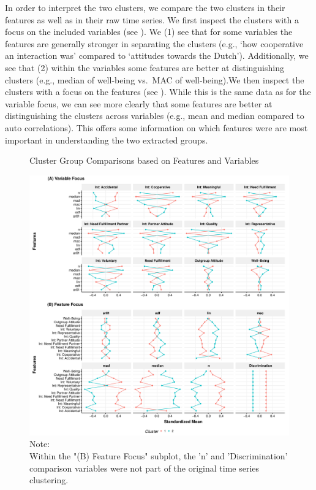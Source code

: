 In order to interpret the two clusters, we compare the two clusters in
their features as well as in their raw time series. We first inspect the
clusters with a focus on the included variables (see
). We (1) see that for some variables the
features are generally stronger in separating the clusters (e.g., `how
cooperative an interaction was' compared to `attitudes towards the
Dutch'). Additionally, we see that (2) within the variables some
features are better at distinguishing clusters (e.g., median of
well-being vs.~MAC of well-being).We then inspect the clusters with a
focus on the features (see ). While this
is the same data as for the variable focus, we can see more clearly that
some features are better at distinguishing the clusters across variables
(e.g., mean and median compared to auto correlations). This offers some
information on which features were are most important in understanding
the two extracted groups.

\begin{figure}[!ht] %
  \caption{Cluster Group Comparisons based on Features and Variables}
  \label{fig:clusterFeatVar}
  \centering\includegraphics[width=\textwidth]{figures/clusterFeatVarComb.pdf}
  \caption*{Note: \\
  Within the "(B) Feature Focus" subplot, the 'n' and 'Discrimination' comparison variables were not part of the original time series clustering.}
\end{figure}


